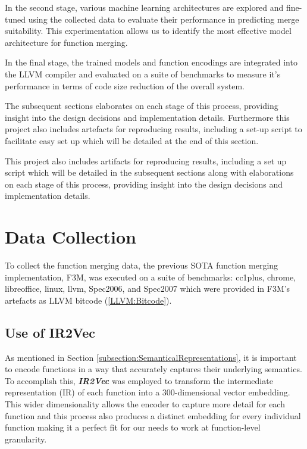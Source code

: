 In the second stage, various machine learning architectures are explored and fine-tuned using the collected data to evaluate their performance in predicting merge suitability. This experimentation allows us to identify the most effective model architecture for function merging.

In the final stage, the trained models and function encodings are integrated into the LLVM compiler and evaluated on a suite of benchmarks to measure it's performance in terms of code size reduction of the overall system.

The subsequent sections elaborates on each stage of this process, providing insight into the design decisions and implementation details. Furthermore this project also includes artefacts for reproducing results, including a set-up script to facilitate easy set up which will be detailed at the end of this section.

This project also includes artifacts for reproducing results, including a set up script which will be detailed in the subsequent sections along with elaborations on each stage of this process, providing insight into the design decisions and implementation details.


\section{Data Collection}
To collect the function merging data, the previous SOTA function merging implementation, F3M, was executed on a suite of benchmarks: cc1plus, chrome, libreoffice, linux, llvm, Spec2006, and Spec2007 which were provided in F3M's artefacts as LLVM bitcode (\ref{LLVM:Bitcode}).

\subsection{Use of IR2Vec} \label{subsection:UseOfIR2Vec}
As mentioned in Section \ref{subsection:SemanticalRepresentations}, it is important to encode functions in a way that accurately captures their underlying semantics. To accomplish this, \textbf{\textit{IR2Vec}} was employed to transform the intermediate representation (IR) of each function into a 300-dimensional vector embedding. This wider dimensionality allows the encoder to capture more detail for each function and this process also produces a distinct embedding for every individual function making it a perfect fit for our needs to work at function-level granularity.

